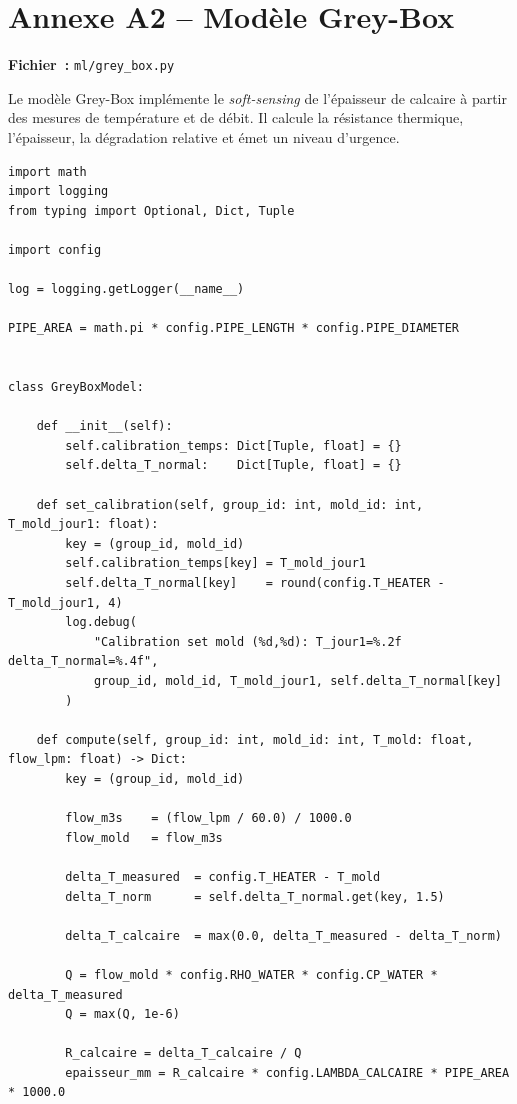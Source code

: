 \section{Annexe A2 -- Modèle Grey-Box}
\label{annexe:greybox}

\textbf{Fichier~:} \texttt{ml/grey\_box.py}

Le modèle Grey-Box implémente le \textit{soft-sensing} de l'épaisseur de calcaire à partir des mesures de température et de débit. Il calcule la résistance thermique, l'épaisseur, la dégradation relative et émet un niveau d'urgence.

\begin{lstlisting}
import math
import logging
from typing import Optional, Dict, Tuple

import config

log = logging.getLogger(__name__)

PIPE_AREA = math.pi * config.PIPE_LENGTH * config.PIPE_DIAMETER


class GreyBoxModel:

    def __init__(self):
        self.calibration_temps: Dict[Tuple, float] = {}
        self.delta_T_normal:    Dict[Tuple, float] = {}

    def set_calibration(self, group_id: int, mold_id: int, T_mold_jour1: float):
        key = (group_id, mold_id)
        self.calibration_temps[key] = T_mold_jour1
        self.delta_T_normal[key]    = round(config.T_HEATER - T_mold_jour1, 4)
        log.debug(
            "Calibration set mold (%d,%d): T_jour1=%.2f  delta_T_normal=%.4f",
            group_id, mold_id, T_mold_jour1, self.delta_T_normal[key]
        )

    def compute(self, group_id: int, mold_id: int, T_mold: float, flow_lpm: float) -> Dict:
        key = (group_id, mold_id)

        flow_m3s    = (flow_lpm / 60.0) / 1000.0
        flow_mold   = flow_m3s

        delta_T_measured  = config.T_HEATER - T_mold
        delta_T_norm      = self.delta_T_normal.get(key, 1.5)

        delta_T_calcaire  = max(0.0, delta_T_measured - delta_T_norm)

        Q = flow_mold * config.RHO_WATER * config.CP_WATER * delta_T_measured
        Q = max(Q, 1e-6)

        R_calcaire = delta_T_calcaire / Q
        epaisseur_mm = R_calcaire * config.LAMBDA_CALCAIRE * PIPE_AREA * 1000.0


\end{lstlisting}
